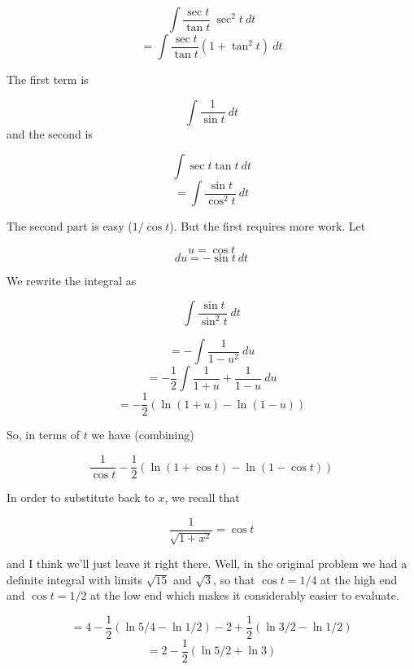 \documentclass[11pt, oneside]{article}
\begin{document}
\[ \int \frac{\sec t}{\tan t} \ \sec^2 t \ dt \]
\[ = \int \frac{\sec t}{\tan t} (1 + \tan^2 t) \ dt \]

The first term is

\[ \int \frac{1}{\sin t} \ dt \]
and the second is

\[ \int \sec t \tan t \ dt \]
\[ = \int \frac{\sin t}{\cos^2 t} \ dt \]

The second part is easy ($1 / \cos t$).  But the first requires more work.  Let 

\[ u = \cos t \]
\[ du = - \sin t \ dt \]

We rewrite the integral as

\[ \int \frac{\sin t}{\sin^2 t} \ dt \]

\[ = - \int \frac{1}{1 - u^2} \ du \]
\[ = - \frac{1}{2} \int \frac{1}{1+u} + \frac{1}{1-u} \ du \]
\[ = - \frac{1}{2} ( \ln (1+u) - \ln (1-u) ) \]

So, in terms of $t$ we have (combining)

\[ \frac{1}{\cos t } - \frac{1}{2} ( \ln (1+\cos t) - \ln (1-\cos t) ) \] 

In order to substitute back to $x$, we recall that

\[ \frac{1}{\sqrt{1 + x^2}} = \cos t \]

and I think we'll just leave it right there.  Well, in the original problem we had a definite integral with limits $\sqrt{15}$ and $\sqrt{3}$, so that $\cos t = 1/4$ at the high end and $\cos t = 1/2$ at the low end which makes it considerably easier to evaluate.

\[ = 4 - \frac{1}{2} (\ln 5/4 - \ln 1/2) - 2 + \frac{1}{2} (\ln 3/2 - \ln 1/2) \]
\[ = 2 - \frac{1}{2}  ( \ln 5/2 +  \ln 3 ) \]
\end{document}
